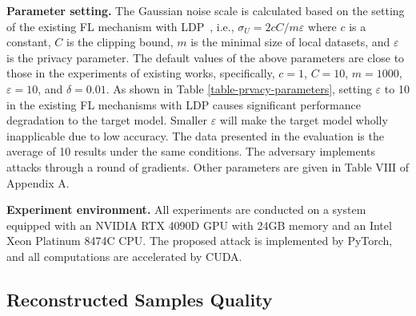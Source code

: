 \documentclass[lettersize,journal]{IEEEtran}
\begin{document}
\textbf{Parameter setting.}
The Gaussian noise scale is calculated based on the setting of the existing FL mechanism with LDP~\cite{Zhou2022Differentially, Kang2020FLwithDP, Naseri2022local}, i.e., $\sigma_U = 2cC / m\varepsilon$ where $c$ is a constant, $C$ is the clipping bound, $m$ is the minimal size of local datasets, and $\varepsilon$ is the privacy parameter. The default values of the above parameters are close to those in the experiments of existing works, specifically, $c=1$, $C=10$, $m=1000$, $\varepsilon=10$, and $\delta=0.01$. As shown in Table \ref{table-prvacy-parameters}, setting $\varepsilon$ to 10 in the existing FL mechanisms with LDP causes significant performance degradation to the target model. Smaller $\varepsilon$ will make the target model wholly inapplicable due to low accuracy. The data presented in the evaluation is the average of 10 results under the same conditions. The adversary implements attacks through a round of gradients. Other parameters are given in Table $\mathrm{VIII}$ of Appendix A.

\textbf{Experiment environment.}
All experiments are conducted on a system equipped with an NVIDIA RTX 4090D GPU with 24GB memory and an Intel Xeon Platinum 8474C CPU. The proposed attack is implemented by PyTorch, and all computations are accelerated by CUDA.

\subsection{Reconstructed Samples Quality}
\label{section-evaluation-quality-comparison}
\end{document}
